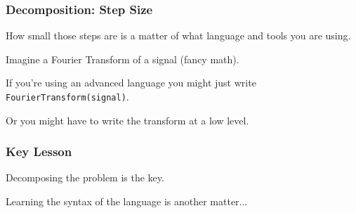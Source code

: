 \begin{frame}
\frametitle{Decomposition: Step Size}
\begin{changemargin}{1cm}

How small those steps are is a matter of what language and tools you are using. 

Imagine a Fourier Transform of a signal (fancy math). 

If you're using an advanced language you might just write \texttt{FourierTransform(signal)}.

Or you might have to write the transform at a low level.

\end{changemargin}
\end{frame}

\begin{frame}
\frametitle{Key Lesson}
\begin{changemargin}{1cm}

Decomposing the problem is the key.

Learning the syntax of the language is another matter...

\end{changemargin}
\end{frame}




